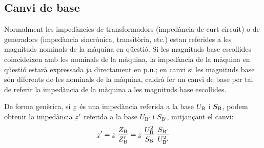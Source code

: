 \subsection{Canvi de base}\label{sec:canvi-base} 

Normalment les imped\`{a}ncies de transformadors (imped\`{a}ncia de curt circuit) o de generadors (imped\`{a}ncia sincr\`{o}nica, transit\`{o}ria, etc.) estan referides a les magnituds nominals de la m\`{a}quina en q\"{u}esti\'{o}. Si les magnituds base escollides coincideixen amb les nominals de la m\`{a}quina,
la imped\`{a}ncia de la m\`{a}quina en q\"{u}esti\'{o} estar\`{a} expressada ja directament en p.u.; en canvi si les magnituds base s\'{o}n diferents de les nominals de la m\`{a}quina, caldr\`{a} fer un canvi de base per tal de referir la imped\`{a}ncia de la m\`{a}quina a les magnituds base escollides.

De forma gen\`{e}rica, si $\cmplx{z}$ \'{e}s una imped\`{a}ncia referida a la base $U_\mathrm{B}$ i $S_\mathrm{B}$, podem obtenir la imped\`{a}ncia $\cmplx{z}'$ referida a la base $U_{\text{B}'}$ i $S_{\text{B}'}$, mitjan\c{c}ant el canvi:
\begin{equation}
   \cmplx{z}' = \cmplx{z} \; \frac{Z\ped{B}}{Z\ped{B}'} = \cmplx{z} \; \frac{U\ped{B}^2}{S\ped{B}} \; \frac{S_{\text{B}'}}{U_{\text{B}'}^2}
\end{equation}

